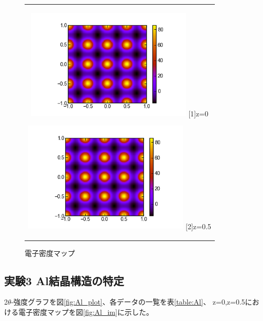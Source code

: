 \documentclass[a4paper,12pt]{jarticle}
\begin{document}
     \begin{figure}[htbp]
      \begin{center}
       \begin{tabular}{c}
       
       \begin{minipage}{0.5\hsize}
        \begin{center}
         \includegraphics[clip,width=8cm]{KCL_im00.png}
         \label{fig:KCl_im00}
         \hspace{1.6cm} [1]z=0
        \end{center}
       \end{minipage}
       
       \begin{minipage}{0.5\hsize}
        \begin{center}
         \includegraphics[clip,width=8cm]{KCL_im05.png}
         \label{fig:KCl_im05}
         \hspace{1.6cm} [2]z=0.5
        \end{center}
       \end{minipage}
       
      \end{tabular} 
      \caption{電子密度マップ}
      \label{fig:KCl_im}
      \end{center}
     \end{figure}  

   
  \subsection{実験3 Al結晶構造の特定}
   2$\theta$-強度グラフを図\ref{fig:Al_plot}、各データの一覧を表\ref{table:Al}、
   z=0,z=0.5における電子密度マップを図\ref{fig:Al_im}に示した。
\end{document}
